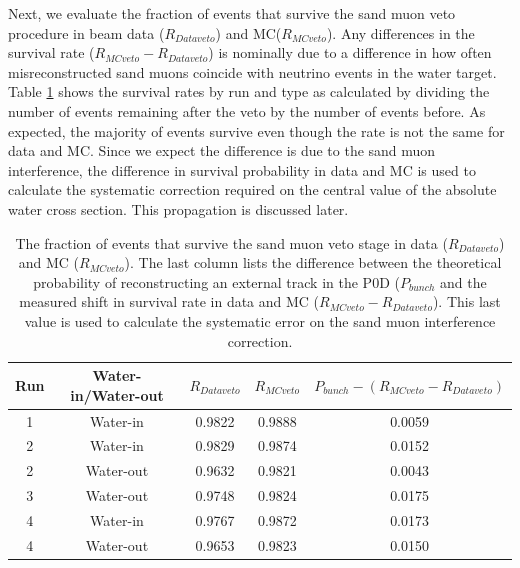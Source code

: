 Next, we evaluate the fraction of events that survive the sand muon veto procedure in beam data ($R_{Data veto}$) and MC($R_{MC veto}$). Any differences in the survival rate ($R_{MC veto} - R_{Data veto}$) is nominally due to a difference in how often misreconstructed sand muons coincide with neutrino events in the water target. Table \ref{tab:rveto} shows the survival rates by run and type as calculated by dividing the number of events remaining after the veto by the number of events before. As expected, the majority of events survive even though the rate is not the same for data and MC. Since we expect the difference is due to the sand muon interference, the difference in survival probability in data and MC is used to calculate the systematic correction required on the central value of the absolute water cross section. This propagation is discussed later.

\begin{table}[h]
\caption{The fraction of events that survive the sand muon veto stage in data ($R_{Data veto}$) and MC ($R_{MC veto}$). The last column lists the difference between the theoretical probability of reconstructing an external track in the P0D ($P_{bunch}$ and the measured shift in survival rate in data and MC ($R_{MC veto} - R_{Data veto}$). This last value is used to calculate the systematic error on the sand muon interference correction.}
\label{tab:rveto}
\centering
\begin{tabular}{ccccc}
\toprule
Run & Water-in/Water-out & $R_{Data veto}$ & $R_{MC veto}$ & $P_{bunch}-(R_{MC veto}-R_{Data veto})$ \\
\midrule
1 & Water-in & 0.9822 & 0.9888 & 0.0059\\
2 & Water-in & 0.9829 & 0.9874 & 0.0152\\
2 & Water-out & 0.9632 & 0.9821 & 0.0043\\
3 & Water-out & 0.9748 & 0.9824 & 0.0175\\
4 & Water-in & 0.9767 & 0.9872 & 0.0173\\
4 & Water-out & 0.9653 & 0.9823 & 0.0150\\
\bottomrule
\end{tabular}
\end{table}

